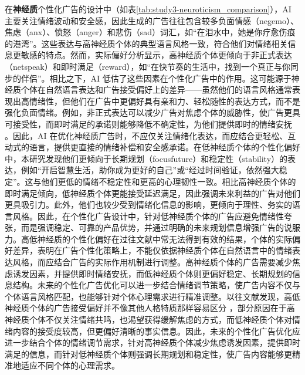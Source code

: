 在\textbf{神经质}个性化广告的设计中（如表\ref{tab:study3-neuroticism_comparison}），AI 主要关注情绪波动和安全感，因此生成的广告往往包含较多负面情感（negemo）、焦虑（anx）、愤怒（anger）和悲伤（sad）词汇，如“在泪水中，她是你疗愈伤痕的港湾”。这些表达与高神经质个体的典型语言风格一致，符合他们对情绪相关信息更敏感的特点。然而，实际偏好分析显示，高神经质个体更倾向于非正式表达（netspeak）和即时满足（reward），如“在快节奏的生活中，找到一个真正与你同步的伴侣”。相比之下，AI 低估了这些因素在个性化广告中的作用。这可能源于神经质个体在自然语言表达和广告接受偏好上的差异——虽然他们的语言风格通常表现出高情绪性，但他们在广告中更偏好具有亲和力、轻松随性的表达方式，而不是强化负面情绪。例如，非正式表达可以减少广告对焦虑个体的威胁性，使广告更具可接受性，而即时满足的承诺则能够降低不确定性，为他们提供即时的情绪安抚 \citep{miller2006neuroticism}。因此，AI 在优化神经质广告时，不应仅关注情绪化表达，而应结合更轻松、互动式的语言，提供更直接的情绪补偿和安全感承诺。在低神经质个体的个性化偏好中，本研究发现他们更倾向于长期规划（focusfuture）和稳定性（stability）的表达，例如“开启智慧生活，助你成为更好的自己”或“经过时间验证，依然强大稳定”。这与他们更低的情绪不稳定性和更高的心理韧性一致。相比高神经质个体的即时满足倾向，低神经质个体更能接受延迟满足，因此强调未来利益的广告对他们更具吸引力。此外，他们也较少受到情绪化信息的影响，更倾向于理性、务实的语言风格。因此，在个性化广告设计中，针对低神经质个体的广告应避免情绪性夸张，而是强调稳定、可靠的产品优势，并通过明确的未来规划信息增强广告的说服力。高低神经质的个性化偏好在过往文献中常无法得到有效的结果，个体的实际偏好差异，表明在广告个性化策略上，不能仅依据神经质个体在自然语言中的情绪表达风格，而应结合广告的实际作用机制进行调整。高神经质个体的广告需要减少焦虑诱发因素，并提供即时情绪安抚，而低神经质个体则更偏好稳定、长期规划的信息结构。未来的个性化广告优化可以进一步结合情绪调节策略，使广告内容不仅与个体语言风格匹配，也能够针对个体心理需求进行精准调整。以往文献发现，高低神经质个体的广告接受偏好并不像其他人格特质那样容易区分 \citep{matz2024potential}，部分原因在于高神经质个体不仅关注情绪共鸣，也渴望获得缓解焦虑的方式，而低神经质个体对情绪内容的接受度较高，但更偏好清晰的事实信息。因此，未来的个性化广告优化应进一步结合个体的情绪调节需求，针对高神经质个体减少焦虑诱发因素，提供即时满足的信息，而针对低神经质个体则强调长期规划和稳定性，使广告内容能够更精准地适应不同个体的心理需求。

